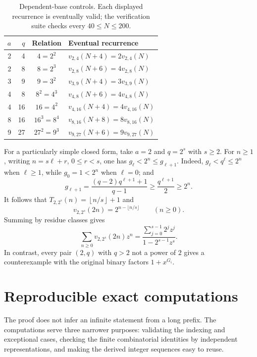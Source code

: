 \documentclass[11pt,letterpaper]{article}
\numberwithin{equation}{section}
\theoremstyle{definition}
\theoremstyle{remark}
\newcommand{\floor}[1]{\left\lfloor#1\right\rfloor}
\begin{document}
\begin{table}[htbp]
\centering
\caption{Dependent-base controls. Each displayed recurrence is eventually
valid; the verification suite checks every $40\le N\le200$.}
\label{tab:dependent}
\begin{tabular}{rrcl}
\toprule
$a$&$q$&Relation&Eventual recurrence\\
\midrule
2&4&$4=2^2$&$v_{2,4}(N+4)=2v_{2,4}(N)$\\
2&8&$8=2^3$&$v_{2,8}(N+6)=4v_{2,8}(N)$\\
3&9&$9=3^2$&$v_{3,9}(N+4)=3v_{3,9}(N)$\\
4&8&$8^2=4^3$&$v_{4,8}(N+6)=4v_{4,8}(N)$\\
4&16&$16=4^2$&$v_{4,16}(N+4)=4v_{4,16}(N)$\\
8&16&$16^3=8^4$&$v_{8,16}(N+8)=8v_{8,16}(N)$\\
9&27&$27^2=9^3$&$v_{9,27}(N+6)=9v_{9,27}(N)$\\
\bottomrule
\end{tabular}
\end{table}

For a particularly simple closed form, take $a=2$ and $q=2^s$ with
$s\ge2$. For $n\ge1$, writing $n=s\ell+r$, $0\le r<s$, one has
$g_\ell<2^n\le g_{\ell+1}$. Indeed,
$g_\ell<q^\ell\le2^n$ when $\ell\ge1$, while $g_0=1<2^n$ when
$\ell=0$; and
\[
 g_{\ell+1}=\frac{(q-2)q^{\ell+1}+1}{q-1}
 \ge\frac{q^{\ell+1}}2\ge2^n.
\]
It follows that $T_{2,2^s}(n)=\floor{n/s}+1$ and
\begin{equation}\label{eq:powertwoeven}
 v_{2,2^s}(2n)=2^{n-\lfloor n/s\rfloor}\qquad(n\ge0).
\end{equation}
Summing by residue classes gives
\begin{equation}\label{eq:powertworational}
 \sum_{n\ge0}v_{2,2^s}(2n)z^n
 =\frac{\sum_{j=0}^{s-1}2^jz^j}{1-2^{s-1}z^s}.
\end{equation}
In contrast, every pair $(2,q)$ with $q>2$ not a power of $2$ gives a
counterexample with the original binary factors $1+x^{G_i}$.

\section{Reproducible exact computations}\label{sec:computations}

The proof does not infer an infinite statement from a long prefix. The
computations serve three narrower purposes: validating the indexing and
exceptional cases, checking the finite combinatorial identities by
independent representations, and making the derived integer sequences easy
to reuse.
\end{document}
